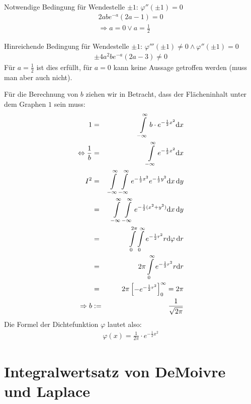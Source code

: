 \documentclass[12pt,a4paper,twocolumn]{article}
\begin{document}
Notwendige Bedingung für Wendestelle $\pm 1$: $\varphi''(\pm 1)=0$\\
\begin{eqnarray}
2abe^{-a} (2a-1) = 0 \\
\Rightarrow a = 0 \lor a = \frac{1}{2}
\end{eqnarray}

Hinreichende Bedingung für Wendestelle $\pm 1$: $\varphi'''(\pm 1)\neq 0 \wedge \varphi''(\pm 1)=0$
\begin{eqnarray}
\pm 4 a^{2} b e^{-a}(2 a -3) \neq 0
\end{eqnarray}
Für $a=\frac{1}{2}$ ist dies erfüllt, für $a=0$ kann keine Aussage getroffen werden (muss man aber auch nicht).

Für die Berechnung von $b$ ziehen wir in Betracht, dass der Flächeninhalt unter dem Graphen $1$ sein muss:
\begin{eqnarray}
1&=&\int\displaylimits^{\infty}_{-\infty} b \cdot e^{-\frac{1}{2}x^2} {\mathrm d}x \\
\Leftrightarrow \frac{1}{b}&=&\int\displaylimits^{\infty}_{-\infty} e^{-\frac{1}{2}x^2} {\mathrm d}x \\
I^2 &=& \int\displaylimits^{\infty}_{-\infty} \int\displaylimits^{\infty}_{-\infty} e^{-\frac{1}{2}x^2} e^{-\frac{1}{2}y^2} {\mathrm d}x \, {\mathrm d}y \\
&=& \int\displaylimits^{\infty}_{-\infty} \int\displaylimits^{\infty}_{-\infty} e^{-\frac{1}{2}(x^2 + y^2)} {\mathrm d}x \, {\mathrm d}y \\ 
&=& \int\displaylimits^{2 \pi}_{0} \int\displaylimits^{\infty}_{0} e^{-\frac{1}{2}r^2} r{\mathrm d}\varphi \, {\mathrm d}r \\
&=& 2 \pi \int\displaylimits^{\infty}_{0} e^{-\frac{1}{2}r^2} r{\mathrm d}r \\
&=& 2 \pi \begin{bmatrix}-e^{-\frac{1}{2} r^2} \end{bmatrix}^\infty_0 = 2 \pi\\
\Rightarrow b&:=&\frac{1}{\sqrt{2\pi}}
\end{eqnarray}
Die Formel der Dichtefunktion $\varphi$ lautet also:
\begin{eqnarray}
 \varphi(x) = \frac{1}{2\pi} \cdot e^{-\frac{1}{2}x^2}
\end{eqnarray}




 \section{Integralwertsatz von DeMoivre und Laplace}
\end{document}
